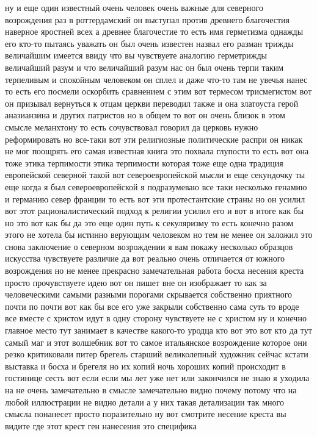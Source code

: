 ну и еще один
известный очень человек очень важные для северного возрождения раз в
роттердамский он выступал против древнего благочестия наверное яростней всех а
древнее благочестие то есть имя герметизма однажды его кто-то пытаясь уважать он
был очень известен назвал его разман трижды величайшим имеется ввиду что вы
чувствуете аналогию герметрижды величайший разум и что величайший разум нас он
был очень терпи таким терпеливым и спокойным человеком он сплел и даже что-то
там не увечья нанес то есть его посмели оскорбить сравнением с этим вот термесом
трисмегистом вот он призывал вернуться к отцам церкви переводил также и она
златоуста герой аназианзина и других патристов но в общем то вот он очень близок
в этом смысле меланхтону то есть сочувствовал говорил да церковь нужно
реформировать но все-таки вот эти религиозные политические распри он никак не
мог поощрять его самая известная книга это похвала глупости то есть вот она тоже
этика терпимости этика терпимости которая тоже еще одна традиция европейской
северной такой вот североевропейской мысли и еще секундочку ты еще когда я был
североевропейской я подразумеваю все таки несколько генамию и германию север
франции то есть вот эти протестантские страны но он усилил вот этот
рационалистический подход к религии усилил его и вот в итоге как бы но это вот
как бы да это еще один путь к секуляризму то есть конечно разом этого не хотела
бы истинно верующим человеком но тем не менее он заложил это снова заключение о
северном возрождении я вам покажу несколько образцов искусства чувствуете
различие да вот реально очень отличается от южного возрождения но не менее
прекрасно замечательная работа босха несения креста просто прочувствуете идею
вот он пишет вне он изображает то как за человеческими самыми разными порогами
скрывается собственно приятного почти по почти вот как бы все его уже закрыли
собственно сама суть то вроде все вместе с христом идут в одну сторону
чувствуете не с христом ну и конечно главное место тут занимает в качестве
какого-то уродца кто вот это вот кто да тут самый маг и этот волшебник вот то
самое итальянское возрождение которое они резко критиковали питер брегель
старший великолепный художник сейчас кстати выставка и босха и брегеля но их
копий ночь хороших копий происходит в гостинице сесть вот если если мы лет уже
нет или закончился не знаю я уходила на не очень замечательно в смысле
замечательно видно почему потому что на любой иллюстрации не видно детали а у
них такая детализации так много смысла понанесет просто поразительно ну вот
смотрите несение креста вы видите где этот крест ген нанесения это специфика
